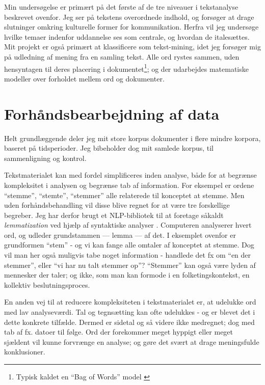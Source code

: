Min undersøgelse er primært på det første af de tre niveauer i tekstanalyse beskrevet ovenfor.
Jeg ser på tekstens overordnede indhold, og forsøger at drage slutninger omkring kulturelle former for kommunikation.
Herfra vil jeg undersøge hvilke temaer indenfor uddannelse ses som centrale, og hvordan de italesættes.
Mit projekt er også primært at klassificere som tekst-mining, idet jeg forsøger mig på udledning af mening fra en samling tekst.
Alle ord rystes sammen, uden hensyntagen til deres placering i dokumentet\footnote{Typisk kaldet en “Bag of Words” model \autocite[s. 28]{kwartlerTextMiningPractice2017}}; og der udarbejdes matematiske modeller over forholdet mellem ord og dokumenter.

\section{Forhåndsbearbejdning af data}\label{sec:preproc}

Helt grundlæggende deler jeg mit store korpus dokumenter i flere mindre korpora, baseret på tidsperioder.
Jeg bibeholder dog mit samlede korpus, til sammenligning og kontrol.

Tekstmaterialet kan med fordel simplificeres inden analyse, både for at begrænse kompleksitet i analysen og begrænse tab af information.
For eksempel er ordene “stemme”, “stemte”, “stemmer” alle relaterede til konceptet at stemme.
Men uden forhåndsbehandling vil disse blive regnet for at være tre forskellige begreber.
Jeg har derfor brugt et NLP-bibliotek \autocite{strakaUDPipeUFAL2020} til at foretage såkaldt \textit{lemmatization} ved hjælp af syntaktiske analyser \autocite[s. 28]{kwartlerTextMiningPractice2017}.
Computeren analyserer hvert ord, og udleder grundstammen --- lemma — af det. I eksemplet ovenfor er grundformen “stem” - og vi kan fange alle omtaler af konceptet at stemme.
Dog vil man her også muligvis tabe noget information - handlede det fx om “en der stemmer”, eller “vi har nu talt stemmer op”?
“Stemmer” kan også være lyden af mennesker der taler; og ikke, som man kan formode i en folketingskontekst, en kollektiv beslutningsproces.

En anden vej til at reducere kompleksiteten i tekstmaterialet er, at udelukke ord med lav analyseværdi.
Tal og tegnsætting kan ofte udelukkes - og er blevet det i dette konkrete tilfælde.
Dermed er sidetal og så videre ikke medregnet; dog med tab af fx. datoer til følge.
Ord der forekommer meget hyppigt eller meget sjældent vil kunne forvrænge en analyse; og gøre det svært at drage meningsfulde konklusioner.

